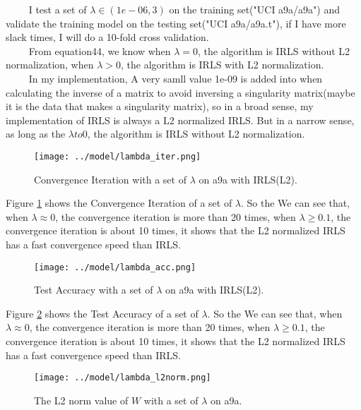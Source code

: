 \documentclass[a4paper]{article}
\begin{document}
$\qquad$ I test a set of $\lambda \in (1e-06,3)$ on the training set("UCI a9a/a9a") and validate the training model on the testing set("UCI a9a/a9a.t"), if I have more slack times, I will do a 10-fold cross validation. \\
$\qquad$ From equation44, we know when $\lambda=0$, the algorithm is IRLS without L2 normalization, when $\lambda>0$, the algorithm is IRLS with L2 normalization. \\
$\qquad$ In my implementation, A very samll value 1e-09 is added into when calculating the inverse of a matrix to avoid inversing a singularity matrix(maybe it is the data that makes a singularity matrix), so in a broad sense, my implementation of IRLS is always a L2 normalized IRLS. But in a narrow sense, as long as the $\lambda to 0$, the algorithm is IRLS without L2 normalization.

\begin{figure}[!htbp]
\begin{center}
\texttt{[image: ../model/lambda\_iter.png]}
\end{center}
\caption{Convergence Iteration with a set of $\lambda$ on a9a with IRLS(L2).}\label{lambda_iter}
\end{figure}
Figure \ref{lambda_iter} shows the Convergence Iteration of a set of $\lambda$.  So the We can see that, when $\lambda \approx 0$, the convergence iteration is more than 20 times, when $\lambda \ge 0.1$, the convergence iteration is about 10 times, it shows that the L2 normalized IRLS has a fast convergence speed than IRLS. 


\begin{figure}[!htbp]
\begin{center}
\texttt{[image: ../model/lambda\_acc.png]}
\end{center}
\caption{Test Accuracy with a set of $\lambda$ on a9a with IRLS(L2).}\label{lambda_acc}
\end{figure}

Figure \ref{lambda_acc} shows the Test Accuracy of a set of $\lambda$.  So the We can see that, when $\lambda \approx 0$, the convergence iteration is more than 20 times, when $\lambda \ge 0.1$, the convergence iteration is about 10 times, it shows that the L2 normalized IRLS has a fast convergence speed than IRLS. 

\begin{figure}[!htbp]
\begin{center}
\texttt{[image: ../model/lambda\_l2norm.png]}
\end{center}
\caption{The L2 norm value of $W$ with a set of $\lambda$ on a9a.}\label{lambda_l2norm}
\end{figure}
\end{document}
